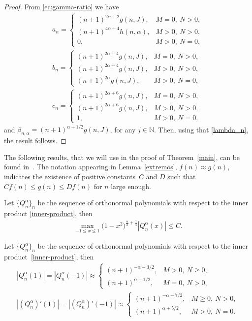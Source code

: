 \begin{proof} From \eqref{ec:gamma-ratio} we have
\begin{gather*}
a_{n}= \begin{cases}
(n+1)^{2\alpha+2}g(n,J), & M=0, \ N>0,\\
(n+1)^{4\alpha+4}h(n,\alpha), & M>0, \ N>0,\\
0, & M>0, \ N=0,
\end{cases} \\
b_{n}= \begin{cases}
(n+1)^{2\alpha+4}g(n,J), & M=0, \ N>0,\\
(n+1)^{2\alpha+4}g(n,J), & M>0, \ N>0,\\
(n+1)^{2\alpha}g(n,J), & M>0, \ N=0,
\end{cases} \\
c_{n}= \begin{cases}
(n+1)^{2\alpha+6}g(n,J), & M=0, \ N>0,\\
(n+1)^{2\alpha+6}g(n,J), & M>0, \ N>0,\\
1, & M>0, \ N=0,
\end{cases}
\end{gather*}
and $\beta_{n,\alpha}=(n+1)^{\alpha+1/2}g(n,J)$, for any $j\in \mathbb{N}$. Then, using that \eqref{lambda_n}, the result follows.
\end{proof}

The following results, that we will use in the proof of Theorem~\ref{main}, can be found in~\cite{foulquie}. The notation appearing in Lemma~\ref{extremos}, $f(n)\approx g(n)$, indicates the existence of positive constants~$C$ and $D$ such that $Cf(n)\le g(n)\le Df(n)$ for $n$ large enough.

\begin{lem}\label{acotacionQ}
	Let $\{Q_n^{\alpha}\}_n$ be the sequence of orthonormal polynomials with respect to the inner product \eqref{inner-product}, then
	\begin{gather*}
	\max_{-1\le x\le 1}\big(1-x^2\big)^{\frac{\alpha}{2}+\frac{1}{4}}|Q_n^{\alpha}(x)|\le C.
	\end{gather*}
\end{lem}

\begin{lem}\label{extremos} Let $\{Q_n^{\alpha}\}_n$ be the sequence of orthonormal polynomials with respect to the inner product~\eqref{inner-product}, then
\begin{gather*}
|Q_n^{\alpha}(1)|=|Q_n^{\alpha}(-1)|\approx \begin{cases}
(n+1)^{-\alpha-3/2}, & M>0, \ N\ge 0,\\
(n+1)^{\alpha+1/2}, & M=0, \ N>0,
\end{cases}\\
|(Q_n^{\alpha})'(1)|=|(Q_n^{\alpha})'(-1)|\approx \begin{cases}
(n+1)^{-\alpha-7/2}, & M\ge 0, \ N> 0,\\
(n+1)^{\alpha+5/2}, & M>0, \ N=0.
\end{cases}
\end{gather*}
\end{lem}

